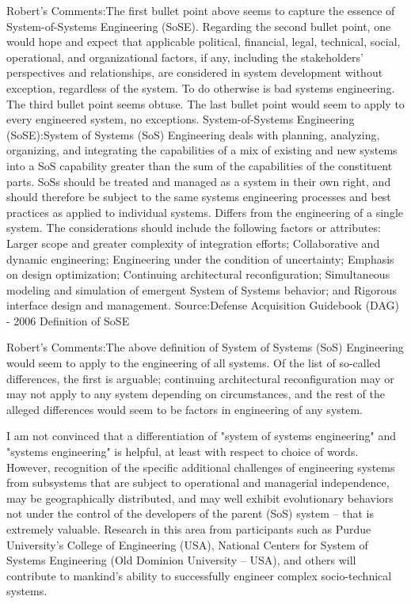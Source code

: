 Robert's Comments:The first bullet point above seems to capture the essence of System-of-Systems Engineering (SoSE). Regarding the second bullet point, one would hope and expect that applicable political, financial, legal, technical, social, operational, and organizational factors, if any, including the stakeholders' perspectives and relationships, are considered in system development without exception, regardless of the system. To do otherwise is bad systems engineering. The third bullet point seems obtuse. The last bullet point would seem to apply to every engineered system, no exceptions.
System-of-Systems Engineering (SoSE):System of Systems (SoS) Engineering deals with planning, analyzing, organizing, and integrating the capabilities of a mix of existing and new systems into a SoS capability greater than the sum of the capabilities of the constituent parts.
SoSs should be treated and managed as a system in their own right, and should therefore be subject to the same systems engineering processes and best practices as applied to individual systems.
Differs from the engineering of a single system. The considerations should include the following factors or attributes:
Larger scope and greater complexity of integration efforts;
Collaborative and dynamic engineering;
Engineering under the condition of uncertainty;
Emphasis on design optimization;
Continuing architectural reconfiguration;
Simultaneous modeling and simulation of emergent System of Systems behavior; and
Rigorous interface design and management.
Source:Defense Acquisition Guidebook (DAG) - 2006 Definition of SoSE

Robert's Comments:The above definition of System of Systems (SoS) Engineering would seem to apply to the engineering of all systems. Of the list of so-called differences, the first is arguable; continuing architectural reconfiguration may or may not apply to any system depending on circumstances, and the rest of the alleged differences would seem to be factors in engineering of any system.

I am not convinced that a differentiation of "system of systems engineering" and "systems engineering" is helpful, at least with respect to choice of words. However, recognition of the specific additional challenges of engineering systems from subsystems that are subject to operational and managerial independence, may be geographically distributed, and may well exhibit evolutionary behaviors not under the control of the developers of the parent (SoS) system – that is extremely valuable. Research in this area from participants such as Purdue University's College of Engineering (USA), National Centers for System of Systems Engineering (Old Dominion University – USA), and others will contribute to mankind's ability to successfully engineer complex socio-technical systems.